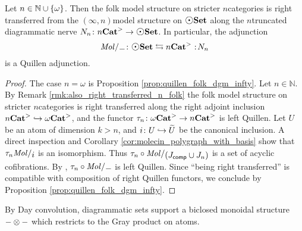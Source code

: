 \begin{thm}\label{thm:quillen_folk_dgm_n}
    Let \( n \in \mathbb{N} \cup \left\{ {\omega} \right\} \).
    Then the folk model structure on stricter \( n \)\nbd categories is right transferred from the \( (\infty, n) \)\nbd model structure on \( \dgmSet \) along the \( n \)\nbd truncated diagrammatic nerve \( \N{n} \colon \snCat{n} \to \dgmSet \).
    In particular, the adjunction 
    \begin{equation*}
        \molecin{-} \colon \dgmSet \leftrightarrows \snCat{n} \cocolon \N{n}
    \end{equation*}
    is a Quillen adjunction.
\end{thm}
\begin{proof}
    The case \( n = \omega \) is Proposition \ref{prop:quillen_folk_dgm_infty}.
    Let \( n \in \mathbb{N} \).
    By Remark \ref{rmk:also_right_transferred_n_folk} the folk model structure on stricter \( n \)\nbd categories is right transferred along the right adjoint inclusion \( {n\mathbf{Cat}}^> \hookrightarrow {\omega\mathbf{Cat}}^> \), and the functor \( \tau_{n} \colon {\omega\mathbf{Cat}}^> \to {n\mathbf{Cat}}^> \) is left Quillen.
    Let \( U \) be an atom of dimension \( k > n \), and \( i \colon U \hookrightarrow \widetilde{U} \) be the canonical inclusion.
    A direct inspection and Corollary \ref{cor:molecin_polygraph_with_basis} show that \( \trunc{n}\molecin{i} \) is an isomorphism.
    Thus \( \trunc{n} \after \molecin{(\Jcomp \cup \Jn{n})} \) is a set of acyclic cofibrations.
    By \cite[E.2.14]{joyal2008theory}, \( \trunc{n} \after \molecin{-} \) is left Quillen. 
    Since ``being right transferred'' is compatible with composition of right Quillen functors, we conclude by Proposition \ref{prop:quillen_folk_dgm_infty}.
\end{proof}

\noindent By Day convolution, diagrammatic sets support a biclosed monoidal structure \( - \otimes - \) which restricts to the Gray product on atoms.

